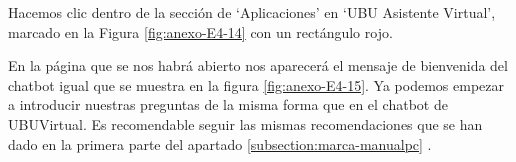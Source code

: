 
Hacemos clic dentro de la sección de `Aplicaciones' en `UBU Asistente Virtual', marcado en la Figura \ref{fig:anexo-E4-14} con un rectángulo rojo.

\newpage

En la página que se nos habrá abierto nos aparecerá el mensaje de bienvenida del chatbot igual que se muestra en la figura \ref{fig:anexo-E4-15}. Ya podemos empezar a introducir nuestras preguntas de la misma forma que en el chatbot de UBUVirtual. Es recomendable seguir las mismas recomendaciones que se han dado en la primera parte del apartado \ref{subsection:marca-manualpc} .


